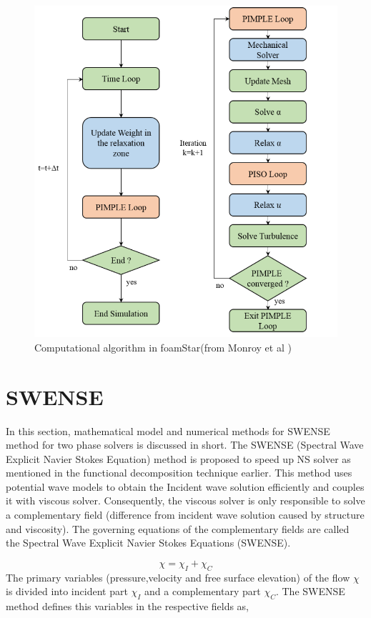 \documentclass[preprint,12pt]{article}
\begin{document}
{\begin{figure}
 \centering 
 \includegraphics[width=\textwidth]{foamStar.png}
 \caption{Computational algorithm in foamStar(from Monroy et al \cite{Monroy2016})}
 \label{foamStar}
\end{figure}

\section*{SWENSE}
In this section, mathematical model and numerical methods for SWENSE method for two phase solvers is discussed in short. The SWENSE (Spectral Wave Explicit  Navier Stokes Equation) method is proposed to speed up NS solver as mentioned in the functional decomposition technique earlier. This method uses potential wave models to obtain the Incident wave solution efficiently and couples it with viscous solver. Consequently, the viscous solver is only responsible to solve a complementary field (difference from incident wave solution caused by structure and viscosity). The governing equations of the complementary fields are called the Spectral Wave Explicit Navier Stokes Equations (SWENSE). 

\begin{equation}
\chi=\chi_I+\chi_C
\end{equation}
The primary variables (pressure,velocity and free surface elevation) of the flow $\chi$ 
is divided into incident part $\chi_I$ and a complementary part $\chi_C$. The SWENSE method defines this variables in the respective fields as, 

}
\end{document}
